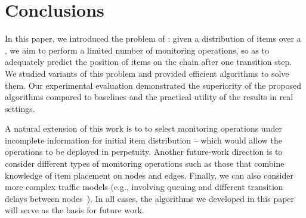 \section{Conclusions}

In this paper, we introduced the problem of \mcproblem: given
a distribution of items over a \markovchain, we aim to perform
a limited number of monitoring operations, so as to adequately
predict the position of items on the chain after one transition step.
We studied variants of this problem
and provided efficient algorithms to solve them. Our experimental evaluation
demonstrated the superiority of the proposed algorithms compared to 
baselines and the practical utility of the results in real settings.

A natural extension of this work is to to select monitoring operations under incomplete information
for initial item distribution
-- which would allow the operations to be deployed in perpetuity.
Another future-work direction is to consider different types of 
monitoring operations such as those
that combine knowledge of item placement on nodes
and edges. Finally, we can also consider more complex traffic models
(e.g., involving queuing and different transition delays between 
nodes~\cite{gallager2012discrete}).
In all cases, the algorithms we developed in this paper will serve as 
the basis for future work.




